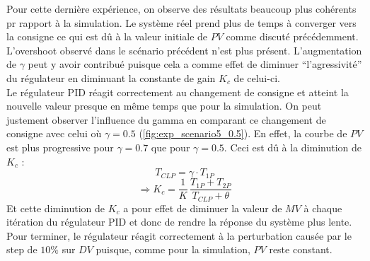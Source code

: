 Pour cette dernière expérience, on observe des résultats beaucoup plus cohérents pr rapport à la simulation. Le système réel prend plus de temps à converger
vers la consigne ce qui est dû à la valeur initiale de $PV$ comme discuté précédemment. L'overshoot observé dans le scénario précédent n'est plus présent.
L'augmentation de $\gamma$ peut y avoir contribué puisque cela a comme effet de diminuer ``l'agressivité'' du régulateur en diminuant la constante de gain $K_c$ de celui-ci.
\\Le régulateur PID réagit correctement au changement de consigne et atteint la nouvelle valeur presque en même temps que pour la simulation. 
On peut justement observer l'influence du gamma en comparant ce changement de consigne avec celui où $\gamma = 0.5$ (\ref{fig:exp_scenario5_0.5}). En effet,
la courbe de $PV$ est plus progressive pour $\gamma = 0.7$ que pour $\gamma = 0.5$. Ceci est dû à la diminution de $K_c$ : 
\[T_{CLP} = \gamma\cdot T_{1P}\]
\[\Rightarrow K_c = \frac{1}{K}\,\frac{T_{1P}+T_{2P}}{T_{CLP}+\theta}\]
Et cette diminution de $K_c$ a pour effet de diminuer la valeur de $MV$ à chaque itération du régulateur PID et donc de rendre la réponse du système plus lente.
Pour terminer, le régulateur réagit correctement à la perturbation causée par le step de $10\%$ sur $DV$ puisque, comme pour la simulation, $PV$ reste constant.
